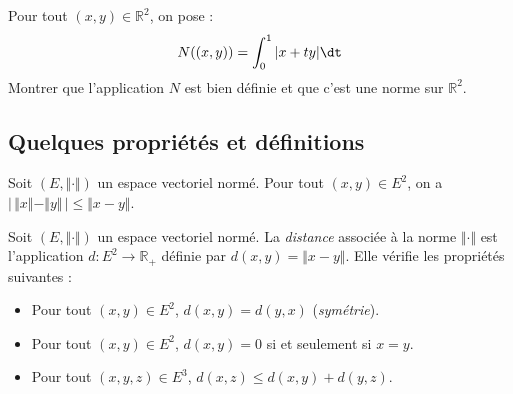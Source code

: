 \documentclass[a4paper,10pt]{report}
\begin{document}
\begin{ApplicationDirecte} Pour tout $(x,y) \in \mathbb{R}^2$, on pose :
$$ N((x,y)) = \int_{0}^1 \vert x+ty \vert \dt$$
Montrer que l'application $N$ est bien définie et que c'est une norme sur $\mathbb{R}^2$.
\end{ApplicationDirecte}
\subsection{Quelques propriétés et définitions}

\begin{Proposition}{} Soit $(E, \Vert \cdot \Vert)$ un espace vectoriel normé. Pour tout $(x,y) \in E^2$, on a $\vert \,  \Vert x \Vert - \Vert y \Vert \, \vert \leq \Vert x-y \Vert$.
\end{Proposition}

\begin{Demonstration}{} 

\vspace{7cm}
\end{Demonstration}

\begin{TheoremeDefinition}{}
Soit $(E, \Vert \cdot \Vert)$ un espace vectoriel normé. La \emph{distance} associée à la norme $\Vert \cdot \Vert$ est l'application $d : E^2 \rightarrow \mathbb{R}_+$ définie par $d(x,y) = \Vert x- y \Vert$. Elle vérifie les propriétés suivantes :

\begin{itemize}
\item Pour tout $(x,y) \in E^2$, $d(x,y)=d(y,x)$ (\emph{symétrie}).
\item Pour tout $(x,y) \in E^2$, $d(x,y)= 0$ si et seulement si $x=y$.
\item Pour tout $(x,y,z) \in E^3$, $d(x,z) \leq d(x,y) + d(y,z)$.
\end{itemize}
\end{TheoremeDefinition}
%
\begin{Demonstration}{}
\vspace{6cm}
\end{Demonstration}
\end{document}
